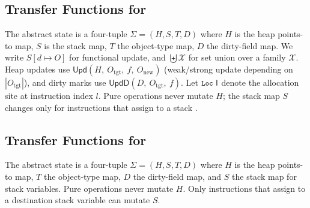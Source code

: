 \subsection{Transfer Functions for \spytecode}
\label{subsec:transfers}

The abstract state is a four-tuple \(\Sigma = (H,S,T,D)\) where \(H\) is the heap
points-to map, \(S\) is the
stack map, \(T\) the object-type map, \(D\) the dirty-field map.
We write \(S[d \mapsto O]\) for functional update, and
\(\biguplus\mathcal{X}\) for set union over a family \(\mathcal{X}\).
Heap updates use
\(\mathsf{Upd}(H,\ O_{\mathrm{tgt}},\ f,\ O_{\mathrm{new}})\)
(weak/strong update depending on \(|O_{\mathrm{tgt}}|\)),
and dirty marks use
\(\mathsf{UpdD}(D,\ O_{\mathrm{tgt}},\ f)\).
Let \(\textsf{\texttt{\small Loc}~{l}}\) denote the allocation site at instruction index \(l\).
Pure operations never mutate \(H\); the stack map \(S\) changes only for
instructions that assign to a stack .
\subsection{Transfer Functions for \spytecode}
\label{subsec:transfers}

The abstract state is a four-tuple \(\Sigma=(H,S,T,D)\) where \(H\) is the heap
points-to map, \(T\) the object-type map, \(D\) the dirty-field map, and \(S\)
the stack map for stack variables.  Pure operations never mutate \(H\).  Only
instructions that assign to a destination stack variable can mutate \(S\).

